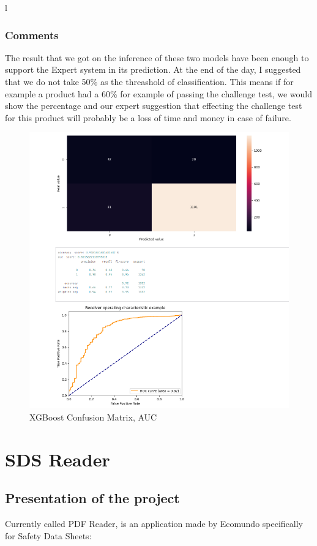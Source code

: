 l\documentclass[a4paper,12pt,twoside]{report}
\begin{document}
\subsubsection{Comments}
The result that we got on the inference of these two models have been enough to support the Expert system in its prediction. At the end of the day, I suggested that we do not take 50\% as the threashold of classification. This means if for example a product had a 60\% for example of passing the challenge test, we would show the percentage and our expert suggestion that effecting the challenge test for this product will probably be a loss of time and money in case of failure.
\begin{figure}[H]
		\includegraphics[width=\textwidth]{images/xgboost}
	\caption[XGBoost Confusion Matrix, AUC]{XGBoost Confusion Matrix, AUC}
\label{xgboost}
\end{figure}
\section{SDS Reader}

\subsection{Presentation of the project}
Currently called PDF Reader, is an application made by Ecomundo specifically for Safety Data Sheets:
\end{document}
